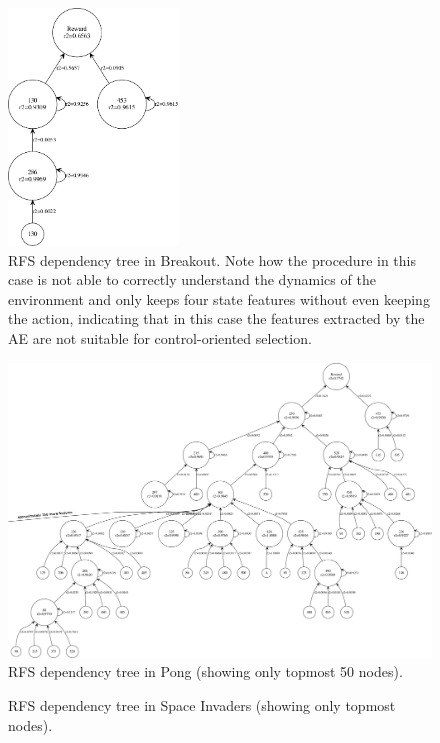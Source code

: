 %
%
\begin{figure}
    \includegraphics[width=0.4\textwidth]{pictures/experiments/rfs_tree_breakout}
    \centering
    \caption[RFS dependency tree in Breakout]{RFS dependency tree in Breakout.
	    Note how the procedure in this case is not able to correctly 
	    understand the dynamics of the environment and only keeps four 
	    state features without even keeping the action, indicating that in 
	    this case the features extracted by the AE are not suitable for 
	    control-oriented selection.}
    \label{f:rfs_tree_breakout}
\end{figure}
%
%
\begin{figure}
    \includegraphics[width=\textwidth]{pictures/experiments/rfs_tree_top_pong}
    \centering
    \caption[RFS dependency tree in Pong]{RFS dependency tree in Pong 
	     (showing only topmost 50 nodes).}
    \label{f:rfs_tree_pong}
\end{figure}
%
%
\begin{figure}
    \centering
    \caption[RFS dependency tree in Space Invaders]{RFS dependency tree in Space 
	     Invaders (showing only topmost nodes).}
    \label{f:rfs_tree_space_invaders}
\end{figure}
%

